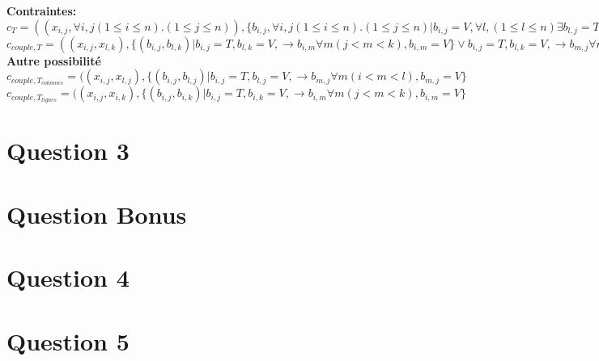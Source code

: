 \documentclass[a4paper,10pt]{article}
\begin{document}
\textbf{Contraintes:}\\
$ c_T = ((x_{i,j}, \forall i,j (1 \leq i \leq n).(1 \leq j \leq n)), \{b_{i,j}, \forall i,j (1 \leq i \leq n).(1 \leq j \leq n)|b_{i,j} = V, \forall l, (1 \leq l \leq n) \exists b_{l,j} = T \lor b_{i,j} = V, \forall k (1 \leq k \leq n), \exists b_{i,k} = T\})  $  \\
$ c_{couple,T} = ((x_{i,j}, x_{l,k}), \{(b_{i,j}, b_{l,k})|b_{i,j} = T, b_{l,k} = V, \rightarrow b_{i,m} \forall m (j < m < k), b_{i,m} = V \} \lor b_{i,j} = T, b_{l,k} = V, \rightarrow b_{m,j} \forall m (i < m < l), b_{m,j} = V) $\\

\textbf{Autre possibilité}\\
$ c_{couple,T_{colonnes}} = ((x_{i,j}, x_{l,j}), \{(b_{i,j}, b_{l,j})|b_{i,j} = T, b_{l,j} = V, \rightarrow b_{m,j} \forall m (i < m < l), b_{m,j} = V \}$\\
$ c_{couple,T_{lignes}} = ((x_{i,j}, x_{i,k}), \{(b_{i,j}, b_{i,k})|b_{i,j} = T, b_{i,k} = V, \rightarrow b_{i,m} \forall m (j < m < k), b_{i,m} = V \}$

\section{Question 3}

\section{Question Bonus}

\section{Question 4}

\section{Question 5}
\end{document}
